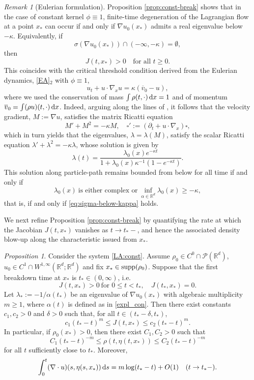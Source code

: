 \documentclass[11pt]{amsart}
\numberwithin{equation}{section}
\newtheorem{proposition}[theorem]{Proposition}
\theoremstyle{definition}
\theoremstyle{remark}
\newtheorem{remark}[theorem]{Remark}
\numberwithin{equation}{section}
\newtheorem{proposition}[theorem]{Proposition}
\newtheorem{remark}[theorem]{Remark}
\newcommand{\R}{\mathbb R}
\newcommand{\calP}{\mathcal P}
\newcommand{\rd}{\textnormal{d}}
\newcommand{\ds}{\textnormal{d}s}
\newcommand{\supp}{{\rm supp}}
\renewcommand{\geq}{\geqslant}
\renewcommand{\ge}{\geqslant}
\renewcommand{\le}{\leqslant}
\begin{document}
 
\begin{remark}[Eulerian formulation]
Proposition \ref{prop:const-break} shows that in the case of constant kernel $\phi\equiv1$, finite-time degeneration of the Lagrangian flow at a point $x_*$ can occur if and only if $\nabla u_0(x_*)$ admits a real eigenvalue below $-\kappa$. Equivalently, if
\begin{equation}\label{eq:sigma-below-kappa}
\sigma(\nabla u_0(x_*))\cap(-\infty,-\kappa)=\emptyset,
\end{equation}
then
\[
J(t,x_*)>0 \quad \text{for all } t\ge0.
\]
This coincides with the critical threshold condition derived from the  Eulerian 
dynamics, \eqref{EA}${}_2$ with $\phi\equiv1$,
\[
u_t+u\cdot\nabla_x u= \kappa(\overline{v}_0 - u),
\]
where we used the conservation of mass $\int \rho(t,\cdot)\,\rd x = 1$ and of momentum $\overline{v}_0=\int (\rho u)(t,\cdot)\,\rd x$.  Indeed, arguing along the lines of \cite[Lemma 4.1]{LT02}, it follows that the velocity gradient, $M:=\nabla u$, satisfies the matrix Ricatti equation
\[
M'+M^2 =   -\kappa M,  \quad \square':=(\partial_t +u\cdot\nabla_x)\square, 
\]
which in turn yields that  the eigenvalues, $\lambda=\lambda(M)$, satisfy the scalar Ricatti equation 
$\lambda' + \lambda^2 = -\kappa\lambda$,
whose solution is given by 
\begin{equation}\label{eq:lambda-of-M}
\lambda(t) =\frac{\lambda_0(x)e^{-\kappa t}}{1+\lambda_0(x)\kappa^{-1}(1-e^{-\kappa t})}.
\end{equation}
This solution along particle-path remains bounded from below for all time if and only if 
\[ 
\lambda_0(x) \ \text{is either complex or} \  
 \inf_{\alpha \in {\mathbb R}^d}\lambda_0(x) \geq -\kappa,
\] 
  that is, if and only if \eqref{eq:sigma-below-kappa} holds.
\end{remark}
 
 
 


We next refine Proposition \ref{prop:const-break} by quantifying the rate at which the Jacobian $J(t,x_*)$ vanishes as $t \to t_*-$, and hence the associated density blow-up along the characteristic issued from $x_*$.

\begin{proposition} \label{prop:const-rate}
Consider the system \eqref{LA:const}. Assume $\rho_0\in C^0\cap\calP(\R^d)$,  $u_0\in C^1\cap W^{1,\infty}(\R^d;\R^d)$ and fix $x_*\in\supp(\rho_0)$. Suppose that the first breakdown time at $x_*$ is $t_*\in(0,\infty)$, i.e.
\[
J(t,x_*)>0\ \text{for }0\le t<t_*, \quad J(t_*,x_*)=0.
\]
Let $\lambda_*:=-1/\alpha(t_*)$ be an eigenvalue of $\nabla u_0(x_*)$ with algebraic multiplicity $m\ge1$, where $\alpha(t)$ is defined as in \eqref{expl_con}. Then there exist constants $c_1,c_2>0$ and $\delta>0$ such that, for all $t\in(t_*-\delta,t_*)$,
\[
c_1 (t_*-t)^m \le J(t,x_*) \le c_2 (t_*-t)^m .
\]
In particular, if $\rho_0(x_*)>0$, then there exist $C_1,C_2>0$ such that
\[
C_1 (t_*-t)^{-m}\le \rho(t,\eta(t,x_*))\le C_2 (t_*-t)^{-m}
\]
for all $t$ sufficiently close to $t_*$.
Moreover,
\[
\int_0^t (\nabla\cdot u)(s,\eta(s,x_*))\,\ds
=
m\log(t_*-t)+O(1)
\quad (t\to t_*-).
\]
\end{proposition}
\end{document}
